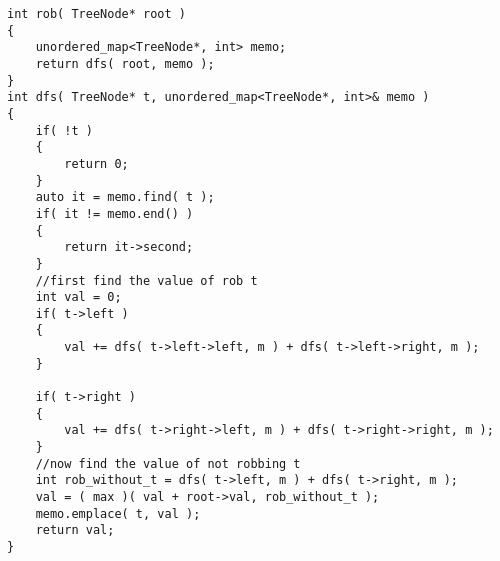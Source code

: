 \setcounter{lstlisting}{0}
\begin{lstlisting}[style=customc, caption={DFS}]
int rob( TreeNode* root )
{
    unordered_map<TreeNode*, int> memo;
    return dfs( root, memo );
}
int dfs( TreeNode* t, unordered_map<TreeNode*, int>& memo )
{
    if( !t )
    {
        return 0;
    }
    auto it = memo.find( t );
    if( it != memo.end() )
    {
        return it->second;
    }
    //first find the value of rob t
    int val = 0;
    if( t->left )
    {
        val += dfs( t->left->left, m ) + dfs( t->left->right, m );
    }

    if( t->right )
    {
        val += dfs( t->right->left, m ) + dfs( t->right->right, m );
    }
    //now find the value of not robbing t
    int rob_without_t = dfs( t->left, m ) + dfs( t->right, m );
    val = ( max )( val + root->val, rob_without_t );
    memo.emplace( t, val );
    return val;
}
\end{lstlisting}